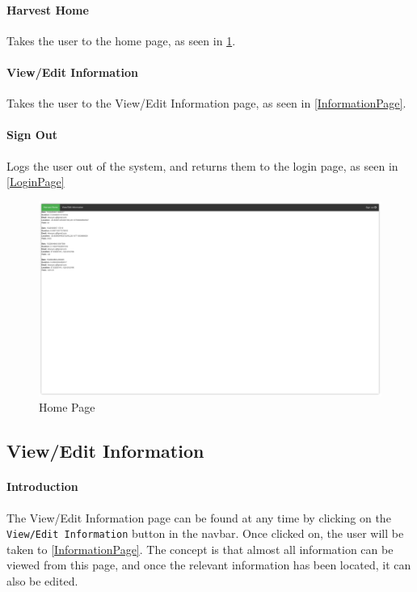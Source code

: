 \documentclass[a4paper,10pt,titlepage]{article}
\begin{document}
\paragraph{Harvest Home}Takes the user to the home page, as seen in \ref{HomePage}.
\paragraph{View/Edit Information}Takes the user to the View/Edit Information page, as seen in \ref{InformationPage}.
\paragraph{Sign Out}Logs the user out of the system, and returns them to the login page, as seen in \ref{LoginPage}

\begin{figure}
 \centering
 \includegraphics[width=12cm, keepaspectratio]{Images/Home-Page.png}
 \caption{Home Page}
 \label{HomePage}
\end{figure}

\subsection{View/Edit Information}
\paragraph{Introduction}The View/Edit Information page can be found at any time by clicking on the \texttt{View/Edit Information} button in the navbar. Once clicked on, the user will be taken to \ref{InformationPage}. The concept is that almost all information can be viewed from this page, and once the relevant information has been located, it can also be edited.
\end{document}
